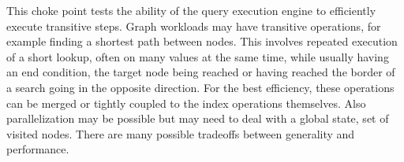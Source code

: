 
This choke point tests the ability of the query execution engine to efficiently
execute transitive steps. Graph workloads may have transitive operations, for
example finding a shortest path between nodes. This involves repeated execution
of a short lookup, often on many values at the same time, while usually having
an end condition, \eg the target node being reached or having reached the border
of a search going in the opposite direction. For the best efficiency, these
operations can be merged or tightly coupled to the index operations themselves.
Also parallelization may be possible but may need to deal with a global state,
\eg set of visited nodes. There are many possible tradeoffs between generality
and performance.


